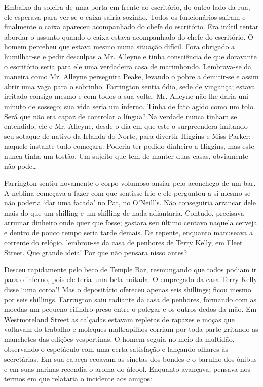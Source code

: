Embaixo da soleira de uma porta em frente ao escritório, do outro
lado da rua, ele esperava para ver se o caixa sairia sozinho. Todos os
funcionários saíram e finalmente o caixa apareceu acompanhado do
chefe do escritório. Era inútil tentar abordar o assunto quando o
caixa estava acompanhado do chefe do escritório. O homem percebeu que
estava mesmo numa situação difícil. Fora obrigado a humilhar-se e
pedir desculpas a Mr. Alleyne e tinha consciência de que doravante o
escritório seria para ele uma verdadeira casa de marimbondo.
Lembrava-se da maneira como Mr. Alleyne perseguira Peake, levando o
pobre a demitir-se e assim abrir uma vaga para o sobrinho. Farrington
sentia ódio, sede de vingança; estava irritado consigo mesmo e com
todos a sua volta. Mr. Alleyne não lhe daria uni minuto de sossego;
sua vida seria um inferno. Tinha de fato agido como um tolo. Será que
não era capaz de controlar a língua? Na verdade nunca tinham se
entendido, ele e Mr. Alleyne, desde o dia em que este o
surpreendera imitando seu sotaque de nativo da Irlanda do Norte,
para divertir Higgins e Miss Parker: naquele instante tudo começara.
Poderia ter pedido dinheiro a Higgins, mas este nunca tinha um tostão.
Um sujeito que tem de manter duas casas, obviamente não pode\ldots{}

Farrington sentiu novamente o corpo volumoso ansiar pelo aconchego de
um bar. A neblina começava a fazer com que sentisse frio e ele
perguntou a si mesmo se não poderia `dar uma facada' no Pat, no
O'Neill's. Não conseguiria arrancar dele mais do que um shilling e
um shilling de nada adiantaria. Contudo, precisava arrumar dinheiro
onde quer que fosse; gastara seu último centavo naquela cerveja e
dentro de pouco tempo seria tarde demais. De repente, enquanto
manuseava a corrente do relógio, lembrou-se da casa de penhores de
Terry Kelly, em Fleet Street. Que grande ideia! Por que não pensara
nisso antes?

Desceu rapidamente pelo beco de Temple Bar, resmungando que todos
podiam ir para o inferno, pois ele teria uma bela noitada. O empregado
da casa Terry Kelly disse `uma coroa'! Mas o depositário ofereceu
apenas seis shillings; ficou mesmo por seis shillings. Farrington saiu
radiante da casa de penhores, formando com as moedas um pequeno
cilindro preso entre o polegar e os outros dedos da mão. Em
Westmoreland Street as calçadas estavam repletas de rapazes e moças
que voltavam do trabalho e moleques maltrapilhos corriam por toda
parte gritando as manchetes das edições vespertinas. O homem seguia
no meio da multidão, observando o espetáculo com uma certa satisfação
e lançando olhares às secretárias. Em sua cabeça ecoavam as sinetas
dos bondes e o barulho dos ônibus e em suas narinas recendia o aroma
do álcool. Enquanto avançava, pensava nos termos em que relataria o
incidente aos amigos:

